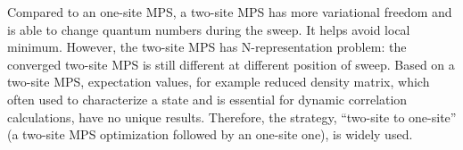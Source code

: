 Compared to an one-site MPS, a two-site MPS has more variational freedom and is able to change quantum numbers during the sweep. It helps avoid local minimum. However, the two-site MPS has N-representation problem: the converged two-site MPS is still different at different position of sweep. Based on a two-site MPS, expectation values, for example reduced density matrix, which often used to characterize a state and is essential for dynamic correlation calculations, have no unique results. 
Therefore, the strategy, ``two-site to one-site'' (a two-site MPS optimization followed by an one-site one), is widely used\cite{olivares-amaya_ab-initio_2015}. 
















